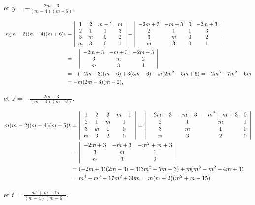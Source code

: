 {{\begin{enumerate}
et $y=-\frac{2m-3}{(m-4)(m-6)}$.

\begin{align*}\ensuremath
m(m-2)(m-4)(m+6)z&=\left|
\begin{array}{cccc}
1&2&m-1&m\\
2&1&1&3\\
3&m&0&2\\
m&3&0&1
\end{array}\right|=\left|
\begin{array}{cccc}
-2m+3&-m+3&0&-2m+3\\
2&1&1&3\\
3&m&0&2\\
m&3&0&1
\end{array}\right|\\
 &=-\left|
\begin{array}{ccc}
-2m+3&-m+3&-2m+3\\
3&m&2\\
m&3&1
\end{array}\right|\\
 &=-(-2m+3)(m-6)+3(5m-6)-m(2m^2-5m+6)=-2m^3+7m^2-6m\\
 &=-m(2m-3)(m-2),
\end{align*}

et $z=-\frac{2m-3}{(m-4)(m-6)}$.

\begin{align*}\ensuremath
m(m-2)(m-4)(m+6)t&=\left|
\begin{array}{cccc}
1&2&3&m-1\\
2&1&m&1\\
3&m&1&0\\
m&3&2&0
\end{array}\right|=\left|
\begin{array}{cccc}
-2m+3&-m+3&-m^2+m+3&0\\
2&1&m&1\\
3&m&1&0\\
m&3&2&0
\end{array}\right|\\
 &=\left|
\begin{array}{ccc}
-2m+3&-m+3&-m^2+m+3\\
3&m&1\\
m&3&2
\end{array}\right|\\
 &=(-2m+3)(2m-3)-3(3m^2-5m-3)+m(m^3-m^2-4m+3)\\
 &=m^4-m^3-17m^2+30m=m(m-2)(m^2+m-15)
\end{align*}

et $t=\frac{m^2+m-15}{(m-4)(m-6)}$.


\end{enumerate}}}
